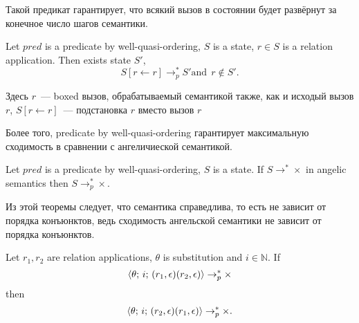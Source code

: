 \noindent Такой предикат гарантирует, что всякий вызов в состоянии будет развёрнут за конечное число шагов семантики. 

\begin{lemma}
Let $pred$ is a predicate by well-quasi-ordering, $S$ is a state, $r \in S$ is a relation application. Then exists state $S'$,
$$S[r \leftarrow \boxed{r}] \rightarrow_p^* S' \mbox{and}\;\, \boxed{r} \not\in S'.$$
\end{lemma}

\noindent Здесь $\boxed{r}$~--- boxed вызов, обрабатываемый семантикой также, как и исходый вызов $r$, $S[r \leftarrow \boxed{r}]$~--- подстановка $\boxed{r}$ вместо вызов $r$

Более того, predicate by well-quasi-ordering гарантирует максимальную сходимость в сравнении с ангеличиеской семантикой.

\begin{theorem}
Let $pred$ is a predicate by well-quasi-ordering, $S$ is a state.
If $S \rightarrow^* \times$ in angelic semantics then $S \rightarrow^*_p \times$.
\end{theorem}

Из этой теоремы следует, что семантика справедлива, то есть не зависит от порядка конъюнктов, ведь сходимость ангельской семантики не зависит от порядка конъюнктов.

\begin{corollary}
Let $r_1, r_2$ are relation applications, $\theta$ is substitution and $i \in \mathbb{N}$. If
$$\langle \theta;\, i;\, (r_1,\epsilon) (r_2,\epsilon) \rangle \rightarrow^*_p \times$$ 
then 
$$\langle \theta;\, i;\,(r_2,\epsilon) (r_1,\epsilon) \rangle \rightarrow^*_p \times.$$
\end{corollary}

